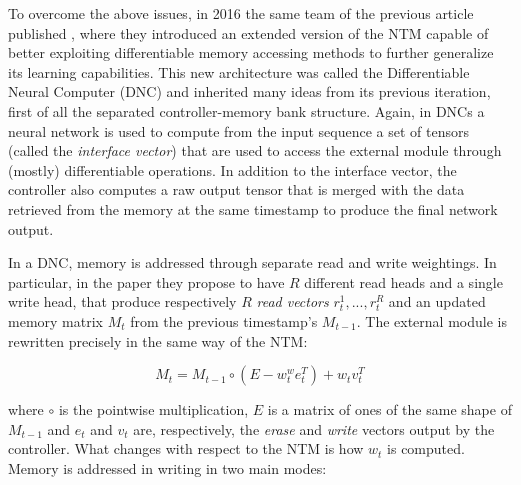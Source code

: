 \documentclass{article}
\begin{document}
To overcome the above issues, in 2016 the same team of the previous article published \cite{GRA16}, where they introduced an extended version of the NTM capable of better exploiting differentiable memory accessing methods to further generalize its learning capabilities. This new architecture was called the Differentiable Neural Computer (DNC) and inherited many ideas from its previous iteration, first of all the separated controller-memory bank structure. Again, in DNCs a neural network is used to compute from the input sequence a set of tensors (called the \textit{interface vector}) that are used to access the external module through (mostly) differentiable operations. In addition to the interface vector, the controller also computes a raw output tensor that is merged with the data retrieved from the memory at the same timestamp to produce the final network output.

In a DNC, memory is addressed through separate read and write weightings. In particular, in the paper they propose to have $R$ different read heads and a single write head, that produce respectively $R$ \textit{read vectors} $r_t^1,..., r_t^R$ and an updated memory matrix $M_t$ from the previous timestamp's $M_{t-1}$. The external module is rewritten precisely in the same way of the NTM:

\begin{equation}
    M_t = M_{t-1} \circ (E-w_t^w e_t^T) + w_t v_t^T
\end{equation}

where $\circ$ is the pointwise multiplication, $E$ is a matrix of ones of the same shape of $M_{t-1}$ and $e_t$ and $v_t$ are, respectively, the \textit{erase} and \textit{write} vectors output by the controller. What changes with respect to the NTM is how $w_t$ is computed. Memory is addressed in writing in two main modes:
\end{document}
